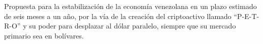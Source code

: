 Propuesta para la estabilización de la economía venezolana en un plazo estimado de seis meses a un año, por la vía de la creación del criptoactivo llamado “P-E-T-R-O” y su poder para desplazar al dólar paralelo, siempre que su mercado primario sea en bolívares.
